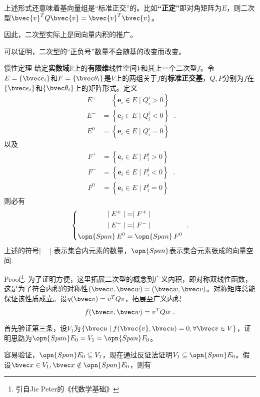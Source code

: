 上述形式还意味着基向量组是“标准正交”的。比如\textbf{“正定”}即对角矩阵为$E$，则二次型$\bvec{v}^{T}Q\bvec{v}=\bvec{v}^{T}\bvec{v}$。

因此，二次型实际上是同向量内积的推广。

可以证明，二次型的“正负号”数量不会随基的改变而改变。
\begin{theorem}{惯性定理}
给定\textbf{实数域}$\mathbb R$上的\textbf{有限维}线性空间$V$和其上一个二次型$f$。令$E=\{\bvec e_i\}$和$F=\{\bvec \theta_i\}$是$V$上的两组关于$f$的\textbf{标准正交基}，$Q,P$分别为$f$在$\{\bvec e_i\}$和$\{\bvec \theta_i\}$上的矩阵形式。定义
\begin{equation}
\begin{aligned}
E^{+} & =\left\{\mathbf{e}_i \in E \mid Q^i_i>0\right\} \\
E^{-} & =\left\{\mathbf{e}_i \in E \mid Q^i_i<0\right\} \\
E^0 & =\left\{\mathbf{e}_i \in E \mid Q^i_i=0\right\}
\end{aligned}~.
\end{equation}
以及
\begin{equation}
\begin{aligned}
F^{+} & =\left\{\mathbf{e}_i \in E \mid P^i_i>0\right\} \\
F^{-} & =\left\{\mathbf{e}_i \in E \mid P^i_i<0\right\} \\
F^0 & =\left\{\mathbf{e}_i \in E \mid P^i_i=0\right\}
\end{aligned}~.
\end{equation}
则必有
\begin{equation}
\left\{
\begin{aligned}
\mid E^{+}\mid&=\mid F^{+}\mid\\
\mid E^{-}\mid&=\mid F^{-}\mid\\
\opn{Span}\, E^{0}&=\opn{Span}\, F^{0}\\
\end{aligned}\right.~.
\end{equation}
上述的符号$\mid \quad\mid$表示集合内元素的数量，$\opn{Span}$表示集合元素张成的向量空间.
\end{theorem}
Proof\footnote{引自Jie Peter的《代数学基础》}.
为了证明方便，这里拓展二次型的概念到广义内积，即对称双线性函数，这是为了符合内积的对称性$(\bvec v,\bvec w)=(\bvec w,\bvec v)$。对称矩阵总能保证该性质成立。设$q(\bvec v)=v^T Q v$，拓展至广义内积
\begin{equation}
f(\bvec v,\bvec w)=v^T Q w~.
\end{equation}

首先验证第三条，设$V_1$为$\{\bvec u\mid f(\bvec{v},\bvec u)=0,\forall \bvec v\in V\}$，证明思路为$\opn{Span}E_0=V_1=\opn{Span}F_0$。

容易验证，$\opn{Span}E_0\subseteq V_1$，现在通过反证法证明$ V_1\subseteq \opn{Span}E_0$。假设$\bvec x\in V_1,\bvec x\notin \opn{Span}E_0$，则有